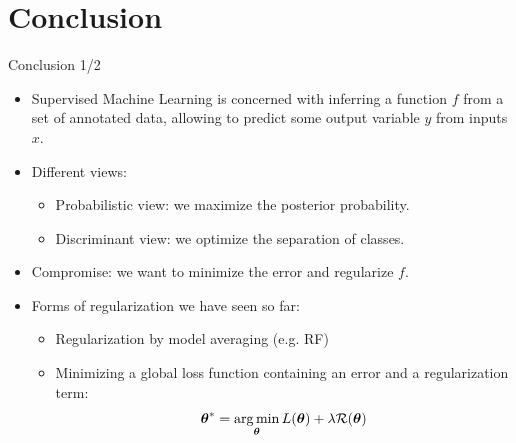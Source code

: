 \documentclass[xcolor=pdftex,dvipsnames,table]{beamer}
\begin{document}

\section{Conclusion}
\begin{frame}{Conclusion 1/2}
	\begin{itemize}
		\item Supervised Machine Learning is concerned with inferring a function $f$ from a set of annotated data, allowing to predict some output variable $y$ from inputs $x$.
		\item Different views:
			\begin{itemize}
				\item Probabilistic view: we maximize the posterior probability.
				\item Discriminant view: we optimize the separation of classes.
			\end{itemize}
		\item Compromise: we want to minimize the error and regularize $f$.
		\item Forms of regularization we have seen so far:
			\begin{itemize}
				\item Regularization by model averaging (e.g. RF)
				\item Minimizing a global loss function containing an error and a regularization term:
				\begin{equation*}
					\boldsymbol{\theta} ^{\ast} = \operatorname*{arg\,min}_{\boldsymbol{\theta}} L (\boldsymbol{\theta}) + \lambda \mathcal{R}(\boldsymbol{\theta})
				\end{equation*}
			\end{itemize}
	\end{itemize}
\end{frame}
\end{document}
